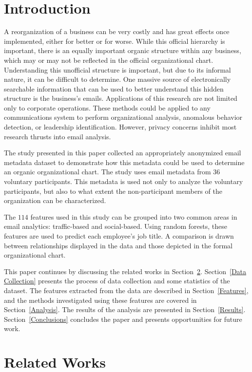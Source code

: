 \documentclass[10pt,twocolumn,conference]{IEEEtran}
\begin{document}
\section{Introduction}
A reorganization of a business can be very costly and has great effects once implemented, either for better or for worse.
While this official hierarchy is important, there is an equally important organic structure within any business, which may or may not be reflected in the official organizational chart.
Understanding this unofficial structure is important, but due to its informal nature, it can be difficult to determine.
One massive source of electronically searchable information that can be used to better understand this hidden structure is the business's emails.
Applications of this research are not limited only to corporate operations.
These methods could be applied to any communications system to perform organizational analysis, anomalous behavior detection, or leadership identification.
However, privacy concerns inhibit most research thrusts into email analysis.  

The study presented in this paper collected an appropriately anonymized email metadata dataset to demonstrate how this metadata could be used to determine an organic organizational chart.
The study uses email metadata from $36$ voluntary participants.
This metadata is used not only to analyze the voluntary participants, but also to what extent the non-participant members of the organization can be characterized.

The $114$ features used in this study can be grouped into two common areas in email analytics: traffic-based and social-based.
Using random forests, these features are used to predict each employee's job title.
A comparison is drawn between relationships displayed in the data and those depicted in the formal organizational chart.  

This paper continues by discussing the related works in Section~\ref{Related Works}.
Section~\ref{Data Collection} presents the process of data collection and some statistics of the dataset.
The features extracted from the data are described in Section~\ref{Features}, and the methods investigated using these features are covered in Section~\ref{Analysis}.
The results of the analysis are presented in Section~\ref{Results}.
Section~\ref{Conclusions} concludes the paper and presents opportunities for future work.  

\section{Related Works} \label{Related Works}
\end{document}
